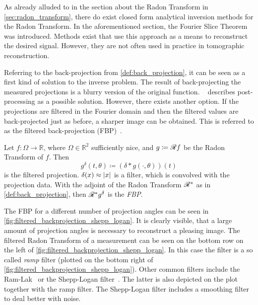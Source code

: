 As already alluded to in the section about the Radon Transform in \autoref{sec:radon_transform},
there do exist closed form analytical inversion methods for the Radon Transform. In the
aforementioned section, the Fourier Slice Theorem was introduced. Methods exist that use this
approach as a means to reconstruct the desired signal. However, they are not often used in practice
in tomographic reconstruction.

Referring to the back-projection from \autoref{def:back_projection}, it can be seen as a first kind
of solution to the inverse problem. The result of back-projecting the measured projections is a
blurry version of the original function. \citeauthor{buzug_computed_2008}~\cite{buzug_computed_2008}
describes post-processing as a possible solution. However, there exists another option. If the
projections are filtered in the Fourier domain and then the filtered values are back-projected just
as before, a sharper image can be obtained. This is referred to as the filtered back-projection
(FBP)~\cite{ramachandran_three-dimensional_1971}.

\begin{definition}\label{def:filtered_back_projection}
	Let \(f\colon \Omega \to \mathbb{R}\), where \(\Omega \in \mathbb{R}^2\) sufficiently nice,
	and \(g \coloneq \mathscr{R} f\) be the Radon Transform of \(f\). Then
	\[ g^\delta(t, \theta) \coloneq (\delta \ast g(\cdot, \theta))(t) \]
	is the filtered projection. \(\delta(x) \approx \lvert x\rvert\) is a filter, which is convolved
	with the projection data. With the adjoint of the Radon Transform \(\mathscr{R}^\ast\) as in
	\autoref{def:back_projection}, then \(\mathscr{R}^\ast g^\delta\) is the \textit{\gls{FBP}}.
\end{definition}

The \gls{FBP} for a different number of projection angles can be seen in
\autoref{fig:filtered_backprojection_shepp_logan}. It is clearly visible, that a large amount of
projection angles is necessary to reconstruct a pleasing image. The filtered Radon Transform of a
measurement can be seen on the bottom row on the left of
\autoref{fig:filtered_backprojection_shepp_logan}. In this case the filter is a so called
\textit{ramp} filter (plotted on the bottom right of
\autoref{fig:filtered_backprojection_shepp_logan}). Other common filters include the
Ram-Lak~\cite{ramachandran_three-dimensional_1971} or the Shepp-Logan
filter~\cite{shepp_fourier_1974}. The latter is also depicted on the plot together with the ramp
filter. The Shepp-Logan filter includes a smoothing filter to deal better with noise.


